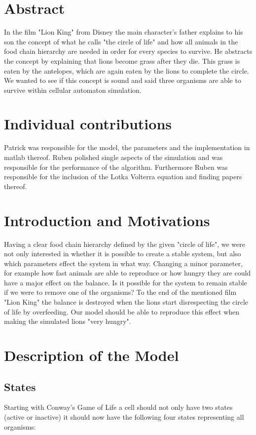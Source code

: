 \documentclass[11pt]{article}
\begin{document}
\section{Abstract}
In the film "Lion King" from Disney the main character's father explains to his son the concept of what he calls "the circle of life" and how all animals in the food chain hierarchy are needed in order for every species to survive. He abstracts the concept by explaining that lions become grass after they die. This grass is eaten by the antelopes, which are again eaten by the lions to complete the circle. We wanted to see if this concept is sound and said three organisms are able to survive within cellular automaton simulation.

\section{Individual contributions}
Patrick was responsible for the model, the parameters and the implementation in matlab thereof. Ruben polished single aspects of the simulation and was responsible for the performance of the algorithm. Furthermore Ruben was responsible for the inclusion of the Lotka Volterra equation and finding papers thereof.

\section{Introduction and Motivations}
Having a clear food chain hierarchy defined by the given "circle of life", we were not only interested in whether it is possible to create a stable system, but also which parameters effect the system in what way. Changing a minor parameter, for example how fast animals are able to reproduce or how hungry they are could have a major effect on the balance. Is it possible for the system to remain stable if we were to remove one of the organisms? To the end of the mentioned film "Lion King" the balance is destroyed when the lions start disrespecting the circle of life by overfeeding. Our model should be able to reproduce this effect when making the simulated lions "very hungry".

\section{Description of the Model}
\subsection{States}
Starting with Conway's Game of Life \cite{gameOfLife} a cell should not only have two states (active or inactive) it should now have the following four states representing all organisms:
\end{document}
